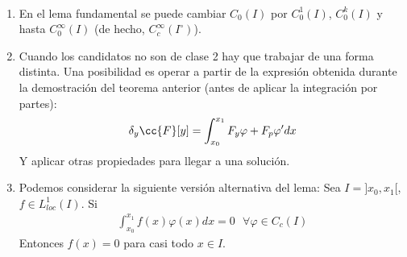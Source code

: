 \begin{observacion}\
    \begin{enumerate}
        \item En el lema fundamental se puede cambiar $C_0(I)$ por $C_0^1(I)$, $C_0^k(I)$ y hasta $C_0^\infty(I)$ (de hecho, $C_c^\infty(I^\circ)$).
        \item Cuando los candidatos no son de clase 2 hay que trabajar de una forma distinta. Una posibilidad es operar a partir de la expresión obtenida durante la demostración del teorema anterior (antes de aplicar la integración por partes):
        \begin{gather*}
            \delta_y \cc{F}[y] = \int_{x_0}^{x_1} F_y\varphi + F_p \varphi' dx
        \end{gather*}
        Y aplicar otras propiedades para llegar a una solución.
        \item Podemos considerar la siguiente versión alternativa del lema: Sea $I=]x_0, x_1[$, $f\in L_{loc}^1(I)$. Si
        \begin{gather*}
            \int_{x_0}^{x_1} f(x)\varphi(x) dx = 0 \ \ \ \forall \varphi \in C_c(I)
        \end{gather*}
        Entonces $f(x)=0$ para casi todo $x\in I$.
    \end{enumerate}
\end{observacion}

